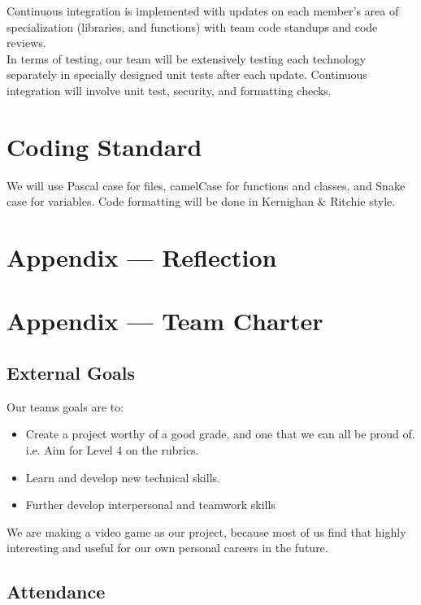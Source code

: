 \documentclass{article}
\begin{document}
Continuous integration is implemented with updates on each member’s area of specialization (libraries, and functions) with team code standups and code reviews.\\

In terms of testing, our team will be extensively testing each technology separately in specially designed unit tests after each update. Continuous integration will involve unit test, security, and formatting checks.


\section{Coding Standard}

We will use Pascal case for files, camelCase for functions and classes, and Snake case for variables. Code formatting will be done in Kernighan \& Ritchie style.

\newpage{}

\section*{Appendix --- Reflection}



\newpage{}

\section*{Appendix --- Team Charter}

\subsection*{External Goals}

Our teams goals are to:
\begin{itemize}
\item{Create a project worthy of a good grade, and one that we can all be proud of. i.e. Aim for Level 4 on the rubrics.}
\item{Learn and develop new technical skills.}
\item{Further develop interpersonal and teamwork skills}
\end{itemize}

We are making a video game as our project, because most of us find that highly interesting and useful for our own personal careers in the future.\\

\subsection*{Attendance}
\end{document}
